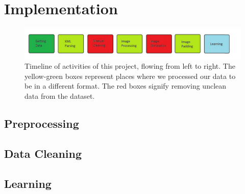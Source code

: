 \section{Implementation}

\begin{figure}[ht]
  \centering
  \includegraphics[width=\textwidth]{images/Timeline.png}
  \caption{
    Timeline of activities of this project, flowing from left to right.  The
    yellow-green boxes represent places where we processed our data to be in a
    different format.  The red boxes signify removing unclean data from the
    dataset.
    }
  \label{fig:timeline}
\end{figure}

\subsection{Preprocessing}

\subsection{Data Cleaning}

\subsection{Learning}


